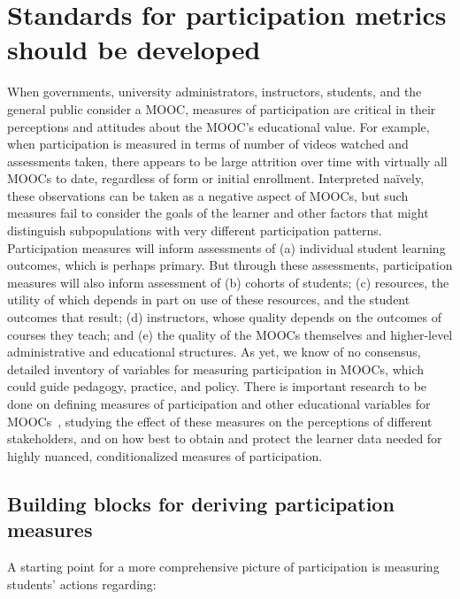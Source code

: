 \section{Standards for participation metrics should be developed}




When governments, university administrators, instructors, students, and
the general public consider a MOOC, measures of participation are
critical in their perceptions and attitudes about the MOOC's educational
value. For example, when participation is measured in terms of number of
videos watched and assessments taken, there appears to be large
attrition over time with virtually all MOOCs to date, regardless of form
or initial enrollment. Interpreted na\"{i}vely, these observations can be
taken as a negative aspect of MOOCs, but such measures fail to consider
the goals of the learner and other factors that might distinguish
subpopulations with very different participation patterns.
Participation measures will inform assessments of (a) individual student
learning outcomes, which is perhaps primary. But through these
assessments, participation measures will also inform assessment of (b)
cohorts of students; (c) resources, the utility of which depends in part
on use of these resources, and the student outcomes that result; (d)
instructors, whose quality depends on the outcomes of courses they
teach; and (e) the quality of the MOOCs themselves and higher-level
administrative and educational structures.  As yet, we know of no
consensus, detailed inventory of variables for measuring participation
in MOOCs, which could guide pedagogy, practice, and policy.
There is
important research to be done on defining measures of participation and
other educational variables for MOOCs~\cite{deboer-ho-reconceptualizing},
studying the effect of these measures on the perceptions of different
stakeholders, and on how best to obtain and protect the
learner data needed for highly nuanced, conditionalized
measures of participation.  

\subsection{Building blocks for deriving participation measures}

A starting point for a more comprehensive picture of
participation is measuring students' actions regarding: 

